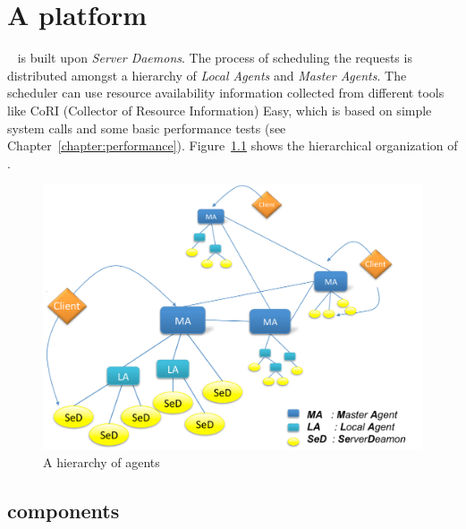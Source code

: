 
\chapter{A \diet platform}\label{ch:description}

\diet~\cite{Caron:2006gf} is built upon \emph{Server Daemons}. The process of
scheduling the requests is distributed amongst a hierarchy of \emph{Local
  Agents} and \emph{Master Agents}. The scheduler can use resource availability
information collected from different tools like CoRI (Collector of Resource
Information) Easy, which is based on simple system calls and some basic
performance tests (see
Chapter~\ref{chapter:performance}). Figure~\ref{fig:platform} shows the
hierarchical organization of \diet.

\begin{figure}[htb]
 \begin{center}
  \includegraphics[scale=.7]{fig/global_platform}
  \caption{\label{fig:platform} A hierarchy of \diet agents}
 \end{center}
\end{figure}

\section{\diet components}
\label{sec:components}

